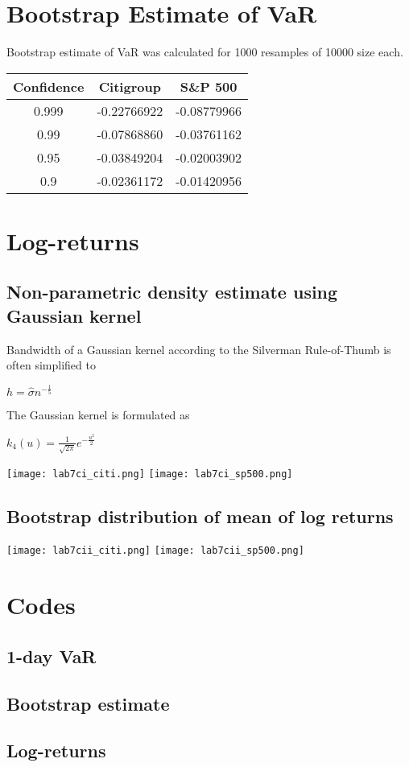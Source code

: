 \documentclass[12pt]{article}
\begin{document}
\section{Bootstrap Estimate of VaR}
Bootstrap estimate of VaR was calculated for 1000 resamples of 10000 size each.
  \begin{center}
    \begin{tabular}{c|c|c}
      Confidence &Citigroup &S\&P 500 \\ \hline
      0.999 &-0.22766922 &-0.08779966 \\
      0.99 &-0.07868860 &-0.03761162 \\
      0.95 &-0.03849204 &-0.02003902 \\
      0.9 &-0.02361172 &-0.01420956 \\ \hline
    \end{tabular}
  \end{center}

\newpage
\section{Log-returns}
  \subsection*{Non-parametric density estimate using Gaussian kernel}
  Bandwidth of a Gaussian kernel according to the Silverman Rule-of-Thumb is often simplified to
    \begin{center}
      $h = \hat{\sigma}n^{-\frac{1}{5}}$
    \end{center}
  The Gaussian kernel is formulated as
    \begin{center}
      $k_{4}(u) = \frac{1}{\sqrt{2\pi}}e^{-\frac{u^{2}}{2}}$
    \end{center}
    \begin{center}
      \texttt{[image: lab7ci\_citi.png]}
      \texttt{[image: lab7ci\_sp500.png]}
    \end{center}
  \newpage
  \subsection*{Bootstrap distribution of mean of log returns}
    \begin{center}
      \texttt{[image: lab7cii\_citi.png]}
      \texttt{[image: lab7cii\_sp500.png]}
    \end{center}

\newpage
\section{Codes}
  \subsection*{1-day VaR}
  
  \subsection*{Bootstrap estimate}
  
  \newpage
  \subsection*{Log-returns}
  
\end{document}
